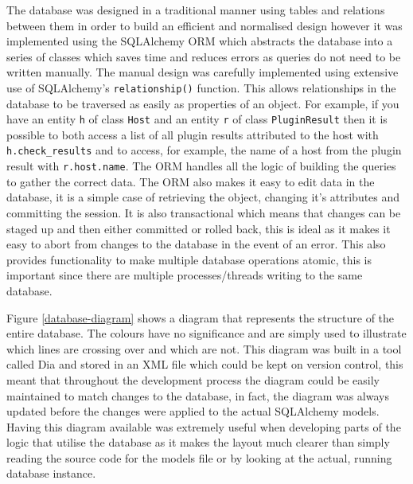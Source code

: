 \documentclass[bsc,logo,twoside,parskip,singlespacing,notimes]{infthesis}
\begin{document}
	The database was designed in a traditional manner using tables and relations
	between them in order to build an efficient and normalised design however it
	was implemented using the SQLAlchemy ORM which abstracts the database into a
	series of classes which saves time and reduces errors as queries do not need
	to be written manually.  The manual design was carefully implemented using
	extensive use of SQLAlchemy's \texttt{relationship()} function.  This allows
	relationships in the database to be traversed as easily as properties of an
	object.  For example, if you have an entity \texttt{h} of class \texttt{Host}
	and an entity \texttt{r} of class \texttt{PluginResult} then it is possible
	to both access a list of all plugin results attributed to the host with
	\texttt{h.check\_results} and to access, for example, the name of a host
	from the plugin result with \texttt{r.host.name}.  The ORM handles all the
	logic of building the queries to gather the correct data.  The ORM also makes
	it easy to edit data in the database, it is a simple case of retrieving the
	object, changing it's attributes and committing the session.  It is also
	transactional which means that changes can be staged up and then either
	committed or rolled back, this is ideal as it makes it easy to abort from
	changes to the database in the event of an error.  This also provides
	functionality to make multiple database operations atomic, this is important
	since there are multiple processes/threads writing to the same database.


	Figure \ref{database-diagram} shows a diagram that represents the structure
	of the entire database.  The colours have no significance and are simply used
	to illustrate which lines are crossing over and which are not.
	This diagram was built in a tool called Dia and stored
	in an XML file which could be kept on version control, this meant that
	throughout the development process the diagram could be easily maintained to
	match changes to the database, in fact, the diagram was always updated before
	the changes were applied to the actual SQLAlchemy models. Having this diagram
	available was extremely useful when developing parts of the logic that utilise
	the database as it makes the layout much clearer than simply reading the source
	code for the models file or by looking at the actual, running database
	instance.
\end{document}
